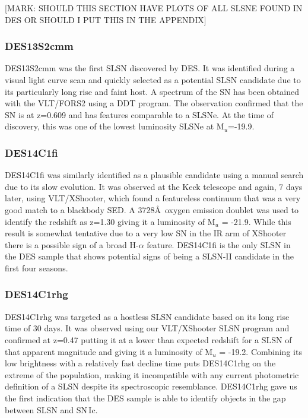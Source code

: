 [MARK: SHOULD THIS SECTION HAVE PLOTS OF ALL SLSNE FOUND IN DES OR SHOULD I PUT THIS IN THE APPENDIX]

\subsubsection{DES13S2cmm}
DES13S2cmm was the first SLSN discovered by DES. It was identified during a visual light curve scan and quickly selected as a potential SLSN candidate due to its particularly long rise and faint host. A spectrum of the SN has been obtained with the VLT/FORS2 using a DDT program. The observation confirmed that the SN is at z=0.609 and has features comparable to a SLSNe. At the time of discovery, this was one of the lowest luminosity SLSNe at M$_u$=-19.9.

\subsubsection{DES14C1fi}
DES14C1fi was similarly identified as a plausible candidate using a manual search due to its slow evolution. It was observed at the Keck telescope and again, 7 days later, using VLT/XShooter, which found a featureless continuum that was a very good match to a blackbody SED. A 3728\AA~oxygen emission doublet was used to identify the redshift as z=1.30 giving it a luminosity of M$_u$ = -21.9. While this result is somewhat tentative due to a very low S\/N in the IR arm of XShooter there is a possible sign of a broad H-$\alpha$ feature. DES14C1fi is the only SLSN in the DES sample that shows potential signs of being a SLSN-II candidate in the first four seasons.

\subsubsection{DES14C1rhg}
DES14C1rhg was targeted as a hostless SLSN candidate based on its long rise time of 30 days. It was observed using our VLT/XShooter SLSN program and confirmed at z=0.47 putting it at a lower than expected redshift for a SLSN of that apparent magnitude and giving it a luminosity of M$_u$ = -19.2. Combining its low brightness with a relatively fast decline time puts DES14C1rhg on the extreme of the population, making it incompatible with any current photometric definition of a SLSN despite its spectroscopic resemblance. DES14C1rhg gave us the first indication that the DES sample is able to identify objects in the gap between SLSN and SN\,Ic.

